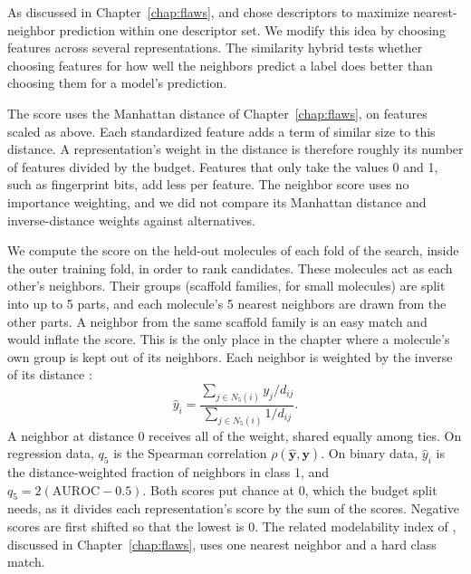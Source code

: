 As discussed in Chapter~\ref{chap:flaws}, \citet{Zheng2000} and \citet{Itskowitz2005} chose descriptors to maximize nearest-neighbor prediction within one descriptor set. We modify this idea by choosing features across several representations. The similarity hybrid tests whether choosing features for how well the neighbors predict a label does better than choosing them for a model's prediction.

The score uses the Manhattan distance of Chapter~\ref{chap:flaws}, on features scaled as above. Each standardized feature adds a term of similar size to this distance. A representation's weight in the distance is therefore roughly its number of features divided by the budget. Features that only take the values 0 and 1, such as fingerprint bits, add less per feature. The neighbor score uses no importance weighting, and we did not compare its Manhattan distance and inverse-distance weights against alternatives.

We compute the score on the held-out molecules of each fold of the search, inside the outer training fold, in order to rank candidates. These molecules act as each other's neighbors. Their groups (scaffold families, for small molecules) are split into up to 5 parts, and each molecule's 5 nearest neighbors are drawn from the other parts. A neighbor from the same scaffold family is an easy match and would inflate the score. This is the only place in the chapter where a molecule's own group is kept out of its neighbors. Each neighbor is weighted by the inverse of its distance \citep{Dudani1976}:
\begin{equation}
\hat{y}_i = \frac{\sum_{j\in N_5(i)} y_j / d_{ij}}{\sum_{j\in N_5(i)} 1/d_{ij}}.
\label{eq:similarity_objective}
\end{equation}
A neighbor at distance 0 receives all of the weight, shared equally among ties. On regression data, $q_5$ is the Spearman correlation $\rho(\hat{\mathbf{y}}, \mathbf{y})$. On binary data, $\hat{y}_i$ is the distance-weighted fraction of neighbors in class 1, and $q_5 = 2(\mathrm{AUROC} - 0.5)$. Both scores put chance at 0, which the budget split needs, as it divides each representation's score by the sum of the scores. Negative scores are first shifted so that the lowest is 0. The related modelability index of \citet{Golbraikh2014}, discussed in Chapter~\ref{chap:flaws}, uses one nearest neighbor and a hard class match.

